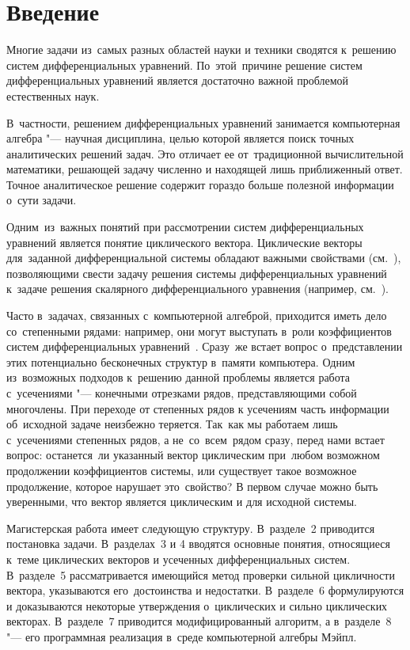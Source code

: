 \section{Введение}

Многие задачи из~самых разных областей науки и техники сводятся к~решению систем дифференциальных уравнений.
По~этой~причине решение систем дифференциальных уравнений является достаточно важной проблемой естественных наук.

В~частности, решением дифференциальных уравнений занимается компьютерная алгебра "--- научная дисциплина,
целью которой является поиск точных аналитических решений задач.
Это отличает ее от~традиционной вычислительной математики, решающей задачу численно и находящей лишь приближенный ответ.
Точное аналитическое решение содержит гораздо больше полезной информации о~сути задачи.
\medskip

Одним~из~важных понятий при рассмотрении систем дифференциальных уравнений является понятие циклического вектора.
Циклические векторы для~заданной дифференциальной системы обладают важными свойствами (см.~\cite{litKovacic}),
позволяющими свести задачу решения системы дифференциальных уравнений
к~задаче решения скалярного дифференциального уравнения (например, см.~\cite{litAbramovResolvingSequences}).

Часто в~задачах, связанных с~компьютерной алгеброй, приходится иметь дело со~степенными рядами:
например, они могут выступать в~роли коэффициентов систем дифференциальных уравнений~\cite{litAbramovPowerSeries}.
Сразу~же встает вопрос о~представлении этих потенциально бесконечных структур в~памяти компьютера.
Одним из~возможных подходов к~решению данной проблемы является работа с~усечениями "--- конечными отрезками рядов, представляющими собой многочлены.
При переходе от степенных рядов к усечениям часть информации об~исходной задаче неизбежно теряется.
Так~как мы работаем лишь с~усечениями степенных рядов, а не~со~всем~рядом сразу, перед нами встает вопрос:
останется~ли указанный вектор циклическим при~любом возможном продолжении коэффициентов системы,
или существует такое возможное продолжение, которое нарушает это~свойство?
В первом случае можно быть уверенными, что вектор является циклическим и для исходной системы.
\medskip

Магистерская работа имеет следующую структуру.
В~разделе~2 приводится постановка задачи.
В~разделах~3 и 4 вводятся основные понятия, относящиеся к~теме циклических векторов и усеченных дифференциальных систем.
В~разделе~5 рассматривается имеющийся метод проверки сильной цикличности вектора, указываются его~достоинства и недостатки.
В~разделе~6 формулируются и доказываются некоторые утверждения о~циклических и сильно циклических векторах.
В~разделе~7 приводится модифицированный алгоритм,
а в~разделе~8 "--- его программная реализация в~среде компьютерной алгебры Мэйпл.
